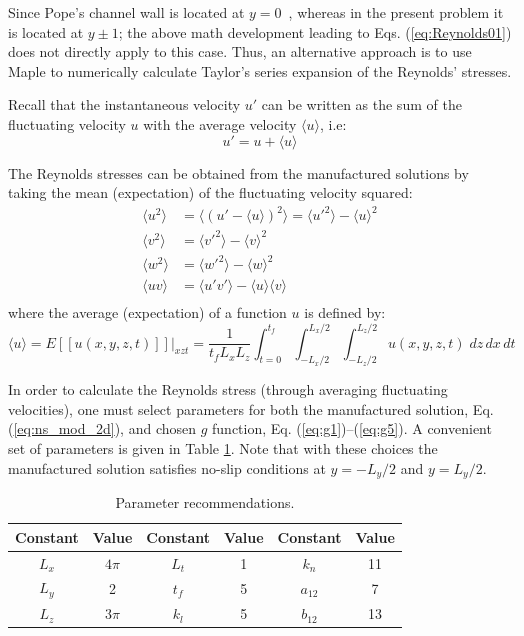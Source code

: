 \documentclass[10pt]{article}
\begin{document}
Since Pope's channel wall is located at $y=0$~\cite{pope2000turbulent}, whereas in the present problem it is located at $y\pm 1$;  the above math development leading to Eqs. (\ref{eq:Reynolds01}) does not directly apply to this case. Thus, an alternative approach is to use Maple \cite{Maple} to numerically calculate  Taylor's series expansion of the Reynolds' stresses.

Recall that the instantaneous velocity $u'$ can be written as the sum of the fluctuating velocity $u$ with the average velocity $\langle u\rangle$, i.e:
$$u'=u+\langle u\rangle$$

The Reynolds stresses can be obtained from the manufactured solutions by taking the mean (expectation) of the fluctuating velocity squared:
\begin{equation}
\begin{split}\label{eq:exp_Reynolds}
\langle u^2\rangle &= \langle (u'-\langle u\rangle)^2 \rangle = \langle{u'}^2\rangle - \langle u\rangle^2 \\
\langle v^2\rangle &= \langle {v'}^2 \rangle - \langle v\rangle^2 \\ 
\langle w^2\rangle &= \langle {w'}^2 \rangle- \langle w\rangle^2 \\
\langle uv \rangle &= \langle u'v' \rangle - \langle u\rangle\langle v\rangle \\  
\end{split}
\end{equation}
where the average (expectation) of a function $u$ is defined by:
\begin{equation}\label{eq:expectation}
\langle u \rangle = E[[u(x,y,z,t)]]\big\rvert_{xzt}= \dfrac{1}{t_f L_x L_z} \int_{t=0}^{t_f} \int_{-L_x/2}^{L_x/2} \int_{-L_z/2}^{L_z/2} u(x,y,z,t) \;dz\,dx\,dt  
\end{equation}


In order to calculate the Reynolds stress (through averaging fluctuating velocities), one must select parameters for both the manufactured solution, Eq. (\ref{eq:ns_mod_2d}), and chosen $g$ function, Eq. (\ref{eq:g1})--(\ref{eq:g5}). A convenient set of parameters is given in Table \ref{table:parameters}. Note that with these choices the manufactured solution satisfies no-slip conditions at $y = -L_y/2$ and $y=L_y/2$.
\begin{table}[htpb]
\caption{Parameter recommendations.}
\vspace{-8pt}
\begin{center}
\begin{tabular}{cc|cc|cc}
\toprule
Constant & Value & Constant & Value & Constant & Value \\
\midrule\midrule
$L_x$	& $4\pi$ & $L_t$  	& 1      & $k_n$ 	& 11 \\
$L_y$	& 2      & $t_f$  	& 5      & $a_{12}$ & 7  \\
$L_z$ 	& $3\pi$ & $k_l$ 	& 5      & $b_{12}$ & 13 \\[0.4ex]
\bottomrule
\end{tabular}
\end{center}
\label{table:parameters}
\end{table}
\end{document}
